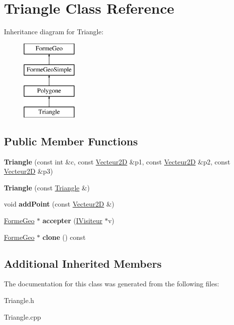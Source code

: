 \hypertarget{class_triangle}{}\section{Triangle Class Reference}
\label{class_triangle}
Inheritance diagram for Triangle\+:\begin{figure}[H]
\begin{center}
\leavevmode
\includegraphics[height=4.000000cm]{d2/d28/class_triangle}
\end{center}
\end{figure}
\subsection*{Public Member Functions}
\begin{DoxyCompactItemize}
\item 
\mbox{\label{class_triangle_a58c2a47f1a57cc41f1e44a661f1163d4}} 
{\bfseries Triangle} (const int \&c, const \mbox{\hyperlink{class_vecteur2_d}{Vecteur2D}} \&p1, const \mbox{\hyperlink{class_vecteur2_d}{Vecteur2D}} \&p2, const \mbox{\hyperlink{class_vecteur2_d}{Vecteur2D}} \&p3)
\item 
\mbox{\label{class_triangle_a58690448d9c5d560186cd5cc328d5ef2}} 
{\bfseries Triangle} (const \mbox{\hyperlink{class_triangle}{Triangle}} \&)
\item 
\mbox{\label{class_triangle_a6e221e6e1f6ee6c2d633dc59332776a2}} 
void {\bfseries add\+Point} (const \mbox{\hyperlink{class_vecteur2_d}{Vecteur2D}} \&)
\item 
\mbox{\label{class_triangle_a12a75ad299825966bad564ddf861e38a}} 
\mbox{\hyperlink{class_forme_geo}{Forme\+Geo}} $\ast$ {\bfseries accepter} (\mbox{\hyperlink{class_i_visiteur}{I\+Visiteur}} $\ast$v)
\item 
\mbox{\label{class_triangle_a22ea564c937c7106ce2f45a594c14a44}} 
\mbox{\hyperlink{class_forme_geo}{Forme\+Geo}} $\ast$ {\bfseries clone} () const
\end{DoxyCompactItemize}
\subsection*{Additional Inherited Members}


The documentation for this class was generated from the following files\+:\begin{DoxyCompactItemize}
\item 
Triangle.\+h\item 
Triangle.\+cpp\end{DoxyCompactItemize}
